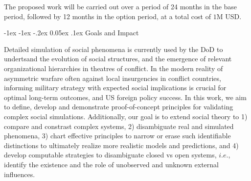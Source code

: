 \documentclass[onecolumn, compsoc,11pt]{IEEEtran}
\makeatletter
\renewcommand\section{\@startsection {section}{1}{\z@}%
  {-1ex \@plus -1ex \@minus -.2ex}%
  {0.05ex \@plus.1ex}%
  {\large\bfseries\scshape}}
\makeatother
\begin{document}
The proposed work will be carried out over a period of 24 months in the base period, followed by 12 months in the option period, at a total cost of $1$M USD. 


\section{Goals and Impact}



Detailed simulation of social phenomena is currently used by the DoD to undertsand the evolution  of social structures, and the emergence of relevant  organizational hierarchies  in theatres of conflict. In the modern reality of asymmetric warfare often against local insurgencies in conflict countries, informing military strategy with expected social implications is crucial for optimal long-term outcomes, and US  foreign policy success.
In this work, we aim to define, develop and demonstrate proof-of-concept principles for validating  complex social simulations. Additionally, our goal is to  extend social theory to 1)  compare and constrast complex systems, 2)  disambiguate real and simulated phenomena,   3) chart effective principles to narrow or erase such identifiable distinctions to ultimately realize more realistic models and predictions, and 4) develop computable strategies  to disambiguate closed vs open systems, $i.e.$, identify the existence and the role of  unobserved and unknown  external influences.
\end{document}
